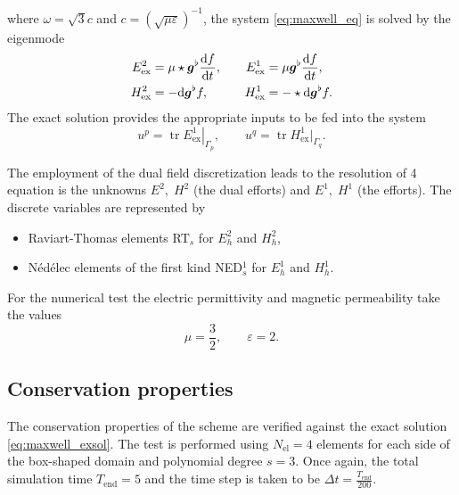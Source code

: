 \documentclass{elsarticle}
\renewcommand\d{\ensuremath{\mathrm{d}}}
\DeclareMathOperator{\tr}{tr}
\begin{document}
where $\omega = \sqrt{3} c$ and $c=(\sqrt{\mu \varepsilon})^{-1}$, the system \eqref{eq:maxwell_eq} is solved by the eigenmode 
\begin{equation}\label{eq:maxwell_exsol}
\begin{aligned}
{E}^2_{\mathrm{ex}} &= \mu \star \bm{g}^\flat \diff{f}{t}, \\    
H^2_{\mathrm{ex}} &= -\d{\bm{g}^\flat} f, 
\end{aligned} \qquad
\begin{aligned}
E^1_{\mathrm{ex}} &= \mu \bm{g}^\flat \diff{f}{t}, \\    
H^1_{\mathrm{ex}} &= -\star \d{\bm{g}^\flat} f.
\end{aligned}
\end{equation}
The exact solution provides the appropriate inputs to be fed into the system
\begin{equation}
    u^p = \left. \tr E^1_{\mathrm{ex}}  \right\vert_{\Gamma_p}, \qquad u^q = \tr H^1_{\mathrm{ex}} \vert_{\Gamma_q}.
\end{equation}

The employment of the dual field discretization leads to the resolution of 4 equation is the unknowns $E^2, \; H^2$ (the dual efforts) and $E^1, \; H^1$ (the efforts). The discrete variables are represented by
\begin{itemize}
    \item Raviart-Thomas elements RT$_s$ for $E^2_h$ and $H^2_h$,
    \item Nédélec elements of the first kind NED$_s^1$ for $E^1_h$ and $H^1_h$.
\end{itemize}
For the numerical test the electric permittivity and magnetic permeability take the values
\begin{equation*}
    \mu = \frac{3}{2}, \qquad \varepsilon = 2.
\end{equation*}

\subsection{Conservation properties}

The conservation properties of the scheme are verified against the exact solution \eqref{eq:maxwell_exsol}. The test is performed using $N_{\text{el}}=4$ elements for each side of the box-shaped domain and polynomial degree $s=3$. Once again, the total simulation time $T_{\text{end}}=5$ and the time step is taken to be $\Delta t= \frac{T_{\text{end}}}{200}$. \\
\end{document}
